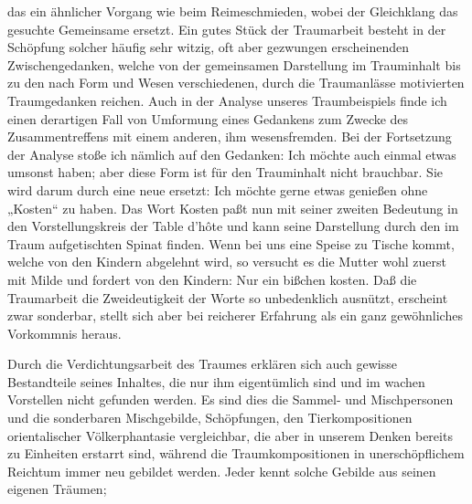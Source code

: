 \documentclass[twoside=true,titlepage=false,open=any, parskip=never, fontsize=10pt, headings=small, chapterprefix=false, appendixprefix=false]{scrbook}
\begin{document}
         
            
            
            
        \pstart
        das ein ähnlicher Vorgang wie beim Reimeschmieden, wobei der
               Gleichklang das gesuchte Gemeinsame ersetzt. Ein gutes Stück der Traumarbeit
               besteht in der Schöpfung solcher häufig sehr witzig, oft aber gezwungen
               erscheinenden Zwischengedanken, welche von der gemeinsamen Darstellung im
               Trauminhalt bis zu den nach Form und Wesen verschiedenen, durch die Traumanlässe motivierten Traumgedanken reichen. Auch in der Analyse
               unseres Traumbeispiels finde ich einen derartigen Fall von Umformung
               eines Gedankens zum Zwecke des Zusammentreffens mit einem anderen, ihm
               wesensfremden. Bei der Fortsetzung der Analyse stoße ich nämlich auf den
               Gedanken: Ich möchte auch einmal etwas umsonst haben;
               aber diese Form ist für den Trauminhalt nicht brauchbar. Sie wird darum
               durch eine neue ersetzt: Ich möchte gerne etwas genießen ohne „Kosten“ zu haben. Das
               Wort Kosten paßt nun mit seiner zweiten
               Bedeutung in den Vorstellungskreis der Table d’hôte und kann seine Darstellung
               durch den im Traum aufgetischten Spinat finden.
               Wenn bei uns eine Speise zu Tische kommt, welche von den Kindern abgelehnt wird,
               so versucht es die Mutter wohl zuerst mit Milde und fordert von den
               Kindern: Nur ein bißchen kosten. Daß die Traumarbeit die Zweideutigkeit der Worte so unbedenklich ausnützt,
               erscheint zwar sonderbar, stellt sich aber bei reicherer Erfahrung als ein ganz
               gewöhnliches Vorkommnis heraus.
        \pend
    
            
        \pstart
        Durch die Verdichtungsarbeit des Traumes erklären sich auch gewisse Bestandteile
               seines Inhaltes, die nur ihm eigentümlich sind und im wachen Vorstellen nicht
               gefunden werden. Es sind dies die Sammel- und
                  Mischpersonen und die sonderbaren
                  Mischgebilde, Schöpfungen, den
               Tierkompositionen orientalischer Völkerphantasie vergleichbar, die aber in
               unserem Denken bereits zu Einheiten erstarrt sind, während die Traumkompositionen in unerschöpflichem Reichtum immer neu gebildet
               werden. Jeder kennt solche Gebilde aus seinen eigenen Träumen;
        \pend
    
\end{document}
